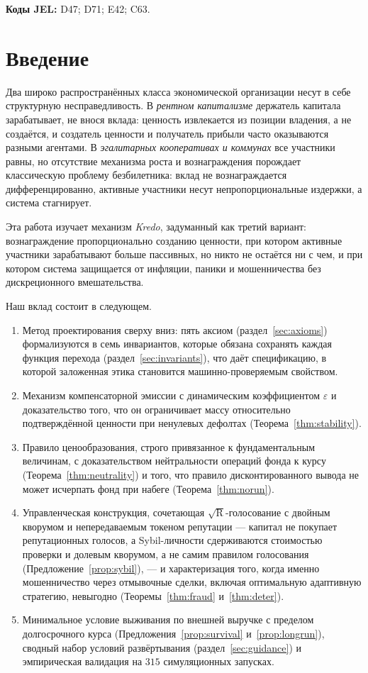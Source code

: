 \documentclass[11pt]{article}
\theoremstyle{plain}
\theoremstyle{definition}
\theoremstyle{remark}
\newcommand{\R}{\mathrm{R}}
\begin{document}
\smallskip
\noindent\textbf{Коды JEL:} D47; D71; E42; C63.

\section{Введение}

Два широко распространённых класса экономической организации несут в себе структурную несправедливость. В \emph{рентном капитализме} держатель капитала зарабатывает, не внося вклада: ценность извлекается из позиции владения, а не создаётся, и создатель ценности и получатель прибыли часто оказываются разными агентами. В \emph{эгалитарных кооперативах и коммунах} все участники равны, но отсутствие механизма роста и вознаграждения порождает классическую проблему безбилетника: вклад не вознаграждается дифференцированно, активные участники несут непропорциональные издержки, а система стагнирует.

Эта работа изучает механизм \emph{Kredo}, задуманный как третий вариант: вознаграждение пропорционально созданию ценности, при котором активные участники зарабатывают больше пассивных, но никто не остаётся ни с чем, и при котором система защищается от инфляции, паники и мошенничества без дискреционного вмешательства.

Наш вклад состоит в следующем.
\begin{enumerate}[leftmargin=*,itemsep=2pt]
    \item Метод проектирования сверху вниз: пять аксиом (раздел~\ref{sec:axioms}) формализуются в семь инвариантов, которые обязана сохранять каждая функция перехода (раздел~\ref{sec:invariants}), что даёт спецификацию, в которой заложенная этика становится машинно-проверяемым свойством.
    \item Механизм компенсаторной эмиссии с динамическим коэффициентом $\varepsilon$ и доказательство того, что он ограничивает массу относительно подтверждённой ценности при ненулевых дефолтах (Теорема~\ref{thm:stability}).
    \item Правило ценообразования, строго привязанное к фундаментальным величинам, с доказательством нейтральности операций фонда к курсу (Теорема~\ref{thm:neutrality}) и того, что правило дисконтированного вывода не может исчерпать фонд при набеге (Теорема~\ref{thm:norun}).
    \item Управленческая конструкция, сочетающая $\sqrt{\R}$-голосование с двойным кворумом и непередаваемым токеном репутации --- капитал не покупает репутационных голосов, а Sybil-личности сдерживаются стоимостью проверки и долевым кворумом, а не самим правилом голосования (Предложение~\ref{prop:sybil}), --- и характеризация того, когда именно мошенничество через отмывочные сделки, включая оптимальную адаптивную стратегию, невыгодно (Теоремы~\ref{thm:fraud} и~\ref{thm:deter}).
    \item Минимальное условие выживания по внешней выручке с пределом долгосрочного курса (Предложения~\ref{prop:survival} и~\ref{prop:longrun}), сводный набор условий развёртывания (раздел~\ref{sec:guidance}) и эмпирическая валидация на $315$ симуляционных запусках.
\end{enumerate}
\end{document}
